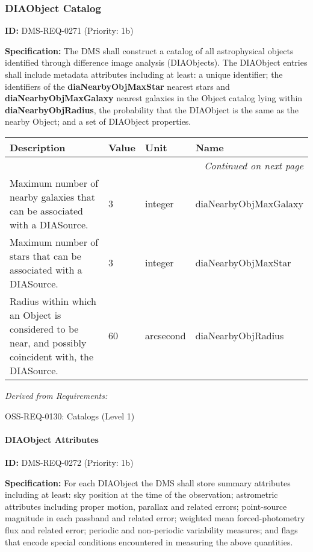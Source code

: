 \documentclass[SE,toc,lsstdraft]{lsstdoc}
\makeatletter
\newcommand{\paramname}[1]{\hspace{0pt}#1}
\newcommand{\unitname}[1]{\hspace{0pt}#1}
\newenvironment{parameters}[0]{%
\setlength\LTleft{0pt}
\setlength\LTright{\fill}
\begin{small}
\begin{longtable}[]{|p{0.49\textwidth}|l|p{0.6in}|p{1.70in}@{}|}

\hline \textbf{Description} & \textbf{Value} & \textbf{Unit} & \textbf{Name} \\ \hline
\endhead

\hline \multicolumn{4}{r}{\emph{Continued on next page}} \\
\endfoot

\hline\hline
\endlastfoot
}{%
\hline
\end{longtable}
\end{small}
}
\makeatother
\begin{document}
\subsubsection{DIAObject Catalog}

\label{DMS-REQ-0271}
\textbf{ID:} DMS-REQ-0271 (Priority: 1b)

\textbf{Specification:} The DMS shall construct a catalog of all astrophysical objects identified through difference image analysis (DIAObjects). The DIAObject entries shall include metadata attributes including at least: a unique identifier; the identifiers of the\textbf{ diaNearbyObjMaxStar} nearest stars and \textbf{diaNearbyObjMaxGalaxy} nearest galaxies in the Object catalog lying within \textbf{diaNearbyObjRadius}, the probability that the DIAObject is the same as the nearby Object; and a set of DIAObject properties.

\begin{parameters}
Maximum number of nearby galaxies that can be associated with a DIASource.
&
3
&
\unitname{%
integer
}
&
\paramname{%
diaNearbyObjMaxGalaxy
} \\\hline
Maximum number of stars that can be associated with a DIASource.
&
3
&
\unitname{%
integer
}
&
\paramname{%
diaNearbyObjMaxStar
} \\\hline
Radius within which an Object is considered to be near, and possibly coincident with, the DIASource.
&
60
&
\unitname{%
arcsecond
}
&
\paramname{%
diaNearbyObjRadius
} \\\hline
\end{parameters}

\emph{Derived from Requirements:}

OSS-REQ-0130:
Catalogs (Level 1) \newline

\paragraph{DIAObject Attributes}\hfill  %

\label{DMS-REQ-0272}
\textbf{ID:} DMS-REQ-0272 (Priority: 1b)

\textbf{Specification:} For each DIAObject the DMS shall store summary attributes including at least: sky position at the time of the observation; astrometric attributes including proper motion, parallax and related errors; point-source magnitude in each passband and related error; weighted mean forced-photometry flux and related error; periodic and non-periodic variability measures; and flags that encode special conditions encountered in measuring the above quantities.
\end{document}
